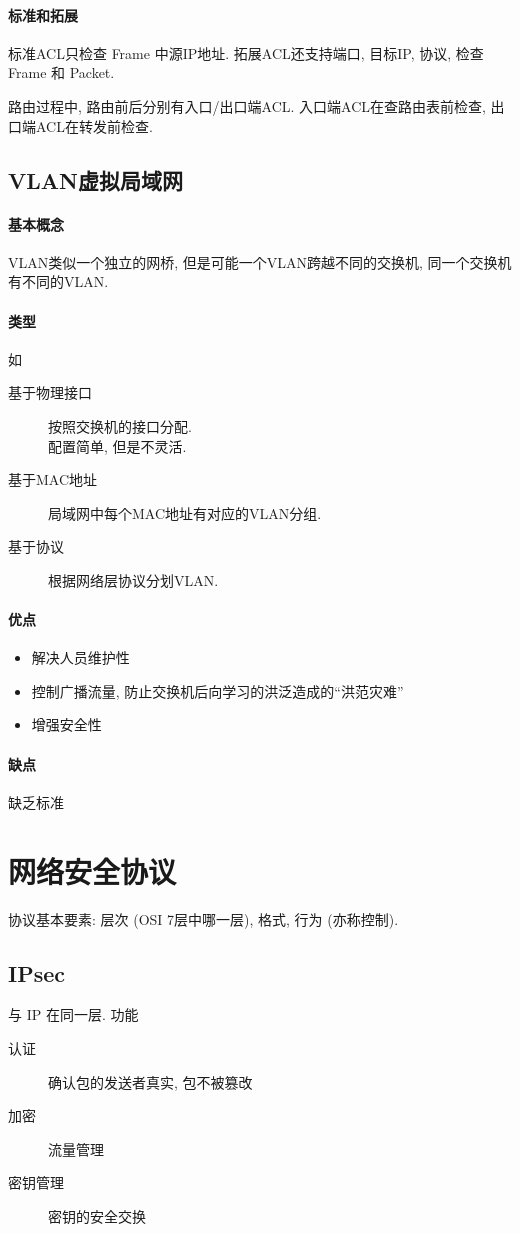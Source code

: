 \documentclass{ctexart}
\begin{document}
\paragraph{标准和拓展} 标准ACL只检查 Frame 中源IP地址.
    拓展ACL还支持端口, 目标IP, 协议, 检查 Frame 和 Packet.\par
    路由过程中, 路由前后分别有入口/出口端ACL. 入口端ACL在查路由表前检查, 出口端ACL在转发前检查.

\subsection{VLAN虚拟局域网}
\paragraph{基本概念} VLAN类似一个独立的网桥, 但是可能一个VLAN跨越不同的交换机, 同一个交换机有不同的VLAN.
\paragraph{类型} 如 \begin{description} 
        \item[基于物理接口] 按照交换机的接口分配.\\ 配置简单, 但是不灵活.
        \item[基于MAC地址] 局域网中每个MAC地址有对应的VLAN分组.
        \item[基于协议] 根据网络层协议分划VLAN.
    \end{description}
\paragraph{优点} \begin{itemize}
        \item 解决人员维护性
        \item 控制广播流量, 防止交换机后向学习的洪泛造成的``洪范灾难''
        \item 增强安全性
    \end{itemize}
\paragraph{缺点} 缺乏标准

\section{网络安全协议}
    协议基本要素: 层次 (OSI 7层中哪一层), 格式, 行为 (亦称控制).
\subsection{IPsec}
    与 IP 在同一层. 功能 \begin{description}
        \item[认证] 确认包的发送者真实, 包不被篡改
        \item[加密] 流量管理
        \item[密钥管理] 密钥的安全交换
    \end{description}
\end{document}
